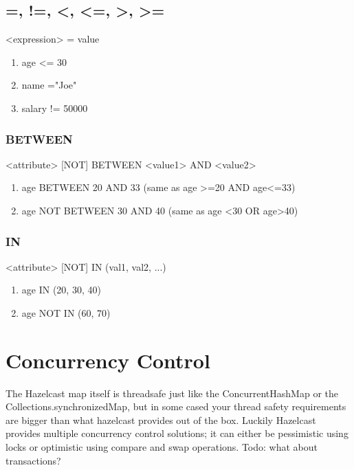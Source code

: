 \subsection{=, !=, <, <=, >, >=}
<expression> = value
\begin{enumerate}
\item age <= 30
\item name ="Joe"
\item salary != 50000
\end{enumerate}

\subsubsection{BETWEEN}
<attribute> [NOT] BETWEEN <value1> AND <value2>

\begin{enumerate}
\item age BETWEEN 20 AND 33 (same as age >=20 AND age<=33)
\item age NOT BETWEEN 30 AND 40 (same as age <30 OR age>40)
\end{enumerate}


\subsubsection{IN}
<attribute> [NOT] IN (val1, val2, ...)
\begin{enumerate}
\item age IN (20, 30, 40)
\item age NOT IN (60, 70)
\end{enumerate}

\section{Concurrency Control}
The Hazelcast map itself is threadsafe just like the ConcurrentHashMap or the Collections.synchronizedMap, but in some cased your thread safety requirements are bigger than what hazelcast provides out of the box. Luckily Hazelcast provides multiple concurrency control solutions;  it can either be pessimistic using locks or optimistic using compare and swap operations. Todo: what about transactions?

